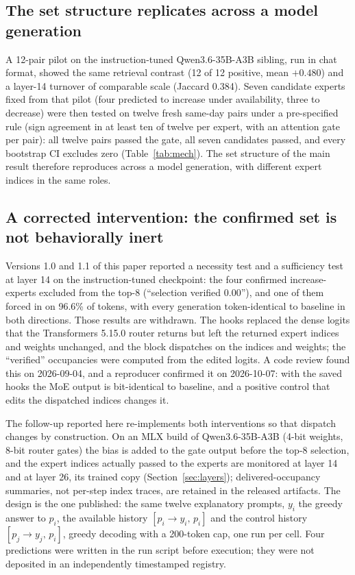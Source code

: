 \documentclass[10pt,a4paper,twocolumn]{article}
\begin{document}
\subsection{The set structure replicates across a model generation}

A 12-pair pilot on the instruction-tuned Qwen3.6-35B-A3B sibling, run in chat
format, showed the same retrieval contrast (12 of 12 positive, mean
\(+0.480\)) and a layer-14 turnover of comparable scale (Jaccard 0.384). Seven
candidate experts fixed from that pilot (four predicted to increase under
availability, three to decrease) were then tested on twelve fresh same-day
pairs under a pre-specified rule (sign agreement in at least ten of twelve per
expert, with an attention gate per pair): all twelve pairs passed the gate,
all seven candidates passed, and every bootstrap CI excludes zero
(Table~\ref{tab:mech}). The set structure of the main result therefore
reproduces across a model generation, with different expert indices in the
same roles.

\subsection{A corrected intervention: the confirmed set is not behaviorally inert}\label{sec:intervention}

Versions 1.0 and 1.1 of this paper reported a necessity test and a
sufficiency test at layer 14 on the instruction-tuned checkpoint: the four
confirmed increase-experts excluded from the top-8 (``selection verified
0.00''), and one of them forced in on 96.6\% of tokens, with every
generation token-identical to baseline in both directions. Those results
are withdrawn. The hooks replaced the dense logits that the Transformers
5.15.0 router returns but left the returned expert indices and weights
unchanged, and the block dispatches on the indices and weights; the
``verified'' occupancies were computed from the edited logits. A code
review found this on 2026-09-04, and a reproducer confirmed it on
2026-10-07: with the saved hooks the MoE output is bit-identical to
baseline, and a positive control that edits the dispatched indices changes
it.

The follow-up reported here re-implements both interventions so that
dispatch changes by construction. On an MLX build of Qwen3.6-35B-A3B
(4-bit weights, 8-bit router gates) the bias is added to the gate output
before the top-8 selection, and the expert indices actually passed to the
experts are monitored at layer 14 and at layer 26, its trained copy
(Section~\ref{sec:layers}); delivered-occupancy summaries, not per-step
index traces, are retained in the released artifacts. The design is the
one published: the same twelve explanatory prompts, \(y_i\) the greedy
answer to \(p_i\), the available history \([p_i \rightarrow y_i,\, p_i]\)
and the control history \([p_j \rightarrow y_j,\, p_i]\), greedy decoding
with a 200-token cap, one run per cell. Four predictions were written in
the run script before execution; they were not deposited in an
independently timestamped registry.
\end{document}
